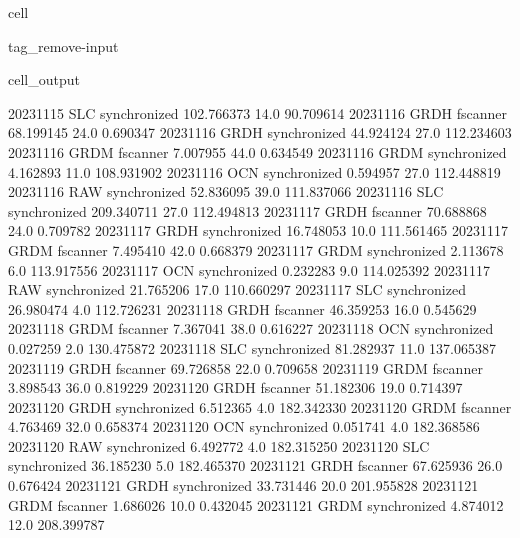 \documentclass[letterpaper,10pt,english]{jupyterBook}
\begin{document}
\begin{sphinxuseclass}{cell}
\begin{sphinxuseclass}{tag_remove-input}
\begin{sphinxVerbatimOutput}
\begin{sphinxuseclass}{cell_output}
\begin{sphinxVerbatim}[commandchars=\\\{\}]
2023\PYGZhy{}11\PYGZhy{}15          SLC  synchronized  102.766373    14.0   90.709614
2023\PYGZhy{}11\PYGZhy{}16         GRDH      fscanner   68.199145    24.0    0.690347
2023\PYGZhy{}11\PYGZhy{}16         GRDH  synchronized   44.924124    27.0  112.234603
2023\PYGZhy{}11\PYGZhy{}16         GRDM      fscanner    7.007955    44.0    0.634549
2023\PYGZhy{}11\PYGZhy{}16         GRDM  synchronized    4.162893    11.0  108.931902
2023\PYGZhy{}11\PYGZhy{}16          OCN  synchronized    0.594957    27.0  112.448819
2023\PYGZhy{}11\PYGZhy{}16          RAW  synchronized   52.836095    39.0  111.837066
2023\PYGZhy{}11\PYGZhy{}16          SLC  synchronized  209.340711    27.0  112.494813
2023\PYGZhy{}11\PYGZhy{}17         GRDH      fscanner   70.688868    24.0    0.709782
2023\PYGZhy{}11\PYGZhy{}17         GRDH  synchronized   16.748053    10.0  111.561465
2023\PYGZhy{}11\PYGZhy{}17         GRDM      fscanner    7.495410    42.0    0.668379
2023\PYGZhy{}11\PYGZhy{}17         GRDM  synchronized    2.113678     6.0  113.917556
2023\PYGZhy{}11\PYGZhy{}17          OCN  synchronized    0.232283     9.0  114.025392
2023\PYGZhy{}11\PYGZhy{}17          RAW  synchronized   21.765206    17.0  110.660297
2023\PYGZhy{}11\PYGZhy{}17          SLC  synchronized   26.980474     4.0  112.726231
2023\PYGZhy{}11\PYGZhy{}18         GRDH      fscanner   46.359253    16.0    0.545629
2023\PYGZhy{}11\PYGZhy{}18         GRDM      fscanner    7.367041    38.0    0.616227
2023\PYGZhy{}11\PYGZhy{}18          OCN  synchronized    0.027259     2.0  130.475872
2023\PYGZhy{}11\PYGZhy{}18          SLC  synchronized   81.282937    11.0  137.065387
2023\PYGZhy{}11\PYGZhy{}19         GRDH      fscanner   69.726858    22.0    0.709658
2023\PYGZhy{}11\PYGZhy{}19         GRDM      fscanner    3.898543    36.0    0.819229
2023\PYGZhy{}11\PYGZhy{}20         GRDH      fscanner   51.182306    19.0    0.714397
2023\PYGZhy{}11\PYGZhy{}20         GRDH  synchronized    6.512365     4.0  182.342330
2023\PYGZhy{}11\PYGZhy{}20         GRDM      fscanner    4.763469    32.0    0.658374
2023\PYGZhy{}11\PYGZhy{}20          OCN  synchronized    0.051741     4.0  182.368586
2023\PYGZhy{}11\PYGZhy{}20          RAW  synchronized    6.492772     4.0  182.315250
2023\PYGZhy{}11\PYGZhy{}20          SLC  synchronized   36.185230     5.0  182.465370
2023\PYGZhy{}11\PYGZhy{}21         GRDH      fscanner   67.625936    26.0    0.676424
2023\PYGZhy{}11\PYGZhy{}21         GRDH  synchronized   33.731446    20.0  201.955828
2023\PYGZhy{}11\PYGZhy{}21         GRDM      fscanner    1.686026    10.0    0.432045
2023\PYGZhy{}11\PYGZhy{}21         GRDM  synchronized    4.874012    12.0  208.399787

\end{sphinxVerbatim}
\end{sphinxuseclass}
\end{sphinxVerbatimOutput}
\end{sphinxuseclass}
\end{sphinxuseclass}
\end{document}
